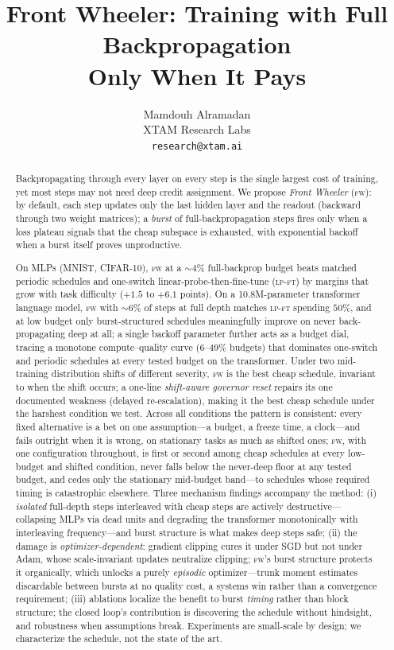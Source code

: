\documentclass[11pt]{article}
\title{Front Wheeler: Training with Full Backpropagation\\
Only When It Pays}
\author{Mamdouh Alramadan\\
XTAM Research Labs\\
\texttt{research@xtam.ai}}
\date{}
\newcommand{\fw}{\textsc{fw}}
\newcommand{\lpft}{\textsc{lp-ft}}
\begin{document}
\linenumbers
\maketitle

\begin{abstract}
Backpropagating through every layer on every step is the single largest cost
of training, yet most steps may not need deep credit assignment. We propose
\emph{Front Wheeler} (\fw{}): by default, each step updates only the last
hidden layer and the readout (backward through two weight matrices); a
\emph{burst} of full-backpropagation steps fires only when a loss plateau
signals that the cheap subspace is exhausted, with exponential backoff when a
burst itself proves unproductive.

On MLPs (MNIST, CIFAR-10), \fw{} at a
${\sim}4\%$ full-backprop budget beats matched periodic schedules and
one-switch linear-probe-then-fine-tune (\lpft{}) by margins that grow with
task difficulty ($+1.5$ to $+6.1$ points). On a 10.8M-parameter transformer
language model, \fw{} with ${\sim}6\%$ of steps at full depth matches
\lpft{} spending $50\%$, and at low budget only burst-structured schedules meaningfully improve on
never back-propagating deep at all; a single backoff parameter further
acts as a budget dial, tracing a monotone compute--quality curve
($6$--$49\%$ budgets) that dominates one-switch and periodic schedules at
every tested budget on the transformer. Under two mid-training distribution shifts of different severity, \fw{}
is the best cheap schedule, invariant to when the shift occurs; a one-line
\emph{shift-aware governor reset} repairs its one documented weakness
(delayed re-escalation), making it the best cheap schedule under the
harshest condition we test. Across all conditions the pattern is consistent:
every fixed alternative is a bet on one assumption---a budget, a freeze
time, a clock---and fails outright when it is wrong, on stationary tasks as
much as shifted ones; \fw{}, with one configuration throughout, is first or second among
cheap schedules at every low-budget and shifted condition, never falls
below the never-deep floor at any tested budget, and cedes only the
stationary mid-budget band---to schedules whose required timing is
catastrophic elsewhere. Three mechanism findings accompany the
method: (i) \emph{isolated} full-depth steps interleaved with cheap steps
are actively destructive---collapsing MLPs via dead units and degrading the
transformer monotonically with interleaving frequency---and burst structure
is what makes deep steps safe; (ii) the damage is \emph{optimizer-dependent}: gradient clipping cures
it under SGD but not under Adam, whose scale-invariant updates neutralize
clipping; \fw{}'s burst structure protects it organically, which unlocks a
purely \emph{episodic} optimizer---trunk moment estimates discardable
between bursts at no quality cost, a systems win rather than a convergence
requirement; (iii) ablations localize the benefit to burst \emph{timing} rather than
block structure; the closed loop's contribution is discovering the schedule
without hindsight, and robustness when assumptions break.
Experiments are small-scale by design; we characterize the schedule, not the
state of the art.
\end{abstract}
\end{document}
